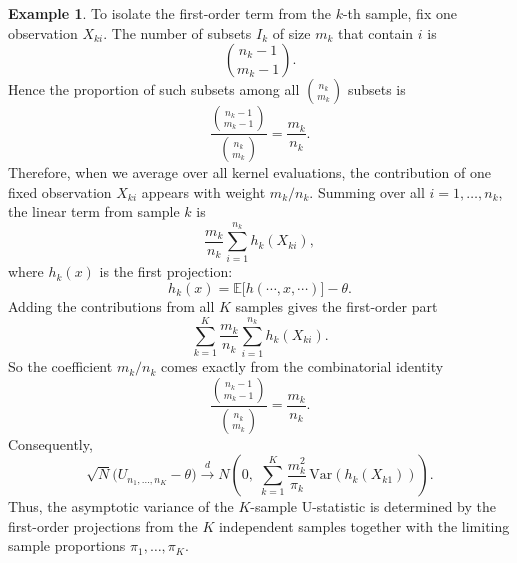 \documentclass[11pt]{article}
\theoremstyle{definition}
\newtheorem{exmp}{Example}[section]
\begin{document}
\begin{exmp}
To isolate the first-order term from the \(k\)-th sample, fix one observation \(X_{ki}\).  
The number of subsets \(I_k\) of size \(m_k\) that contain \(i\) is
\[
\binom{n_k-1}{m_k-1}.
\]
Hence the proportion of such subsets among all \(\binom{n_k}{m_k}\) subsets is
\[
\frac{\binom{n_k-1}{m_k-1}}{\binom{n_k}{m_k}}
=
\frac{m_k}{n_k}.
\]
Therefore, when we average over all kernel evaluations, the contribution of one fixed observation \(X_{ki}\) appears with weight \(m_k/n_k\). Summing over all \(i=1,\dots,n_k\), the linear term from sample \(k\) is
\[
\frac{m_k}{n_k}\sum_{i=1}^{n_k} h_k(X_{ki}),
\]
where \(h_k(x)\) is the first projection:
\[
h_k(x)
=
\mathbb{E}\bigl[h(\cdots,x,\cdots)\bigr]-\theta.
\]
Adding the contributions from all \(K\) samples gives the first-order part
\[
\sum_{k=1}^K \frac{m_k}{n_k}\sum_{i=1}^{n_k} h_k(X_{ki}).
\]
So the coefficient \(m_k/n_k\) comes exactly from the combinatorial identity
\[
\frac{\binom{n_k-1}{m_k-1}}{\binom{n_k}{m_k}}=\frac{m_k}{n_k}.
\]
Consequently,
\[
\sqrt{N}\bigl(U_{n_1,\dots,n_K}-\theta\bigr)
\xrightarrow{d}
N\!\left(
0,\;
\sum_{k=1}^K \frac{m_k^2}{\pi_k}\,\mathrm{Var}(h_k(X_{k1}))
\right).
\]
Thus, the asymptotic variance of the $K$-sample U-statistic is determined by the first-order projections from the $K$ independent samples together with the limiting sample proportions $\pi_1,\dots,\pi_K$.
\end{exmp}
\end{document}
